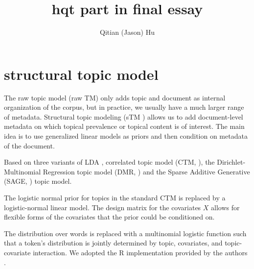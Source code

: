 \documentclass{article}
\title{ hqt part in final essay }
\author{Qitian (Jason) Hu}
\begin{document}
\maketitle 


\section{structural topic model}

The raw topic model (raw TM) only adds topic and document as internal organization of the corpus, but in practice, we usually have a much larger range of metadata. Structural topic modeling (sTM \cite{stm_sosc}) allows us to add document-level metadata on which topical prevalence or topical content is of interest. The main idea is to use generalized linear models as priors and then condition on metadata of the document. 

Based on three variants of LDA \cite{original_lda}, correlated topic model (CTM, \cite{blei2007correlated}), the Dirichlet-Multinomial Regression topic model (DMR, \cite{mimno2008topic}) and the Sparse Additive Generative (SAGE, \cite{taddy2013multinomial}) topic model.


 The logistic normal prior for topics in the standard CTM is replaced by a logistic-normal linear model. The design matrix for the covariates $X$ allows for flexible forms of the covariates that the prior could be conditioned on.
 
 The distribution over words is replaced with a multinomial logistic function such that a token's distribution is jointly determined by topic, covariates, and topic-covariate interaction. We adopted the R implementation provided by the authors \cite{stm_package}. 
\end{document}
